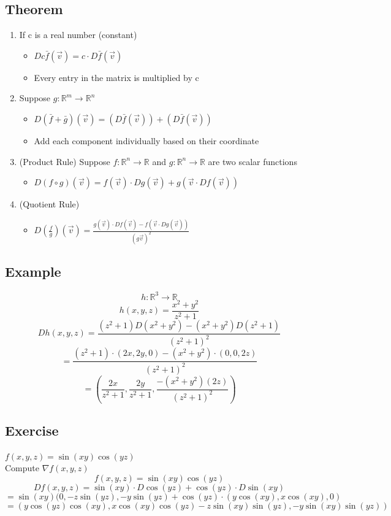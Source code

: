 \documentclass{article}
\begin{document}
\subsection*{Theorem}
\begin{enumerate}
    \item If c is a real number (constant)
    \begin{itemize}
        \item $Dc\bar{f}(\vec{v})=c\cdot D\bar{f}(\vec{v})$
        \item Every entry in the matrix is multiplied by c
    \end{itemize}
    \item Suppose $g:\mathbb{R}^m\rightarrow\mathbb{R}^n$
    \begin{itemize}
        \item $D(\bar{f}+\bar{g})(\vec{v})=(D\bar{f}(\vec{v}))+(D\bar{f}(\vec{v}))$
        \item Add each component individually based on their coordinate
    \end{itemize}
    \item (Product Rule) Suppose $f:\mathbb{R}^n\rightarrow\mathbb{R}$ and $g: \mathbb{R}^n\rightarrow\mathbb{R}$ are two scalar functions
    \begin{itemize}
        \item $D(f\circ g)(\vec{v})=f(\vec{v})\cdot Dg(\vec{v})+g(\vec{v}\cdot Df(\vec{v}))$
    \end{itemize}
    \item (Quotient Rule) 
    \begin{itemize}
        \item $D(\frac{f}{g})(\vec{v})=\frac{g(\vec{v})\cdot Df(\vec{v})-f(\vec{v}\cdot Dg(\vec{v}))}{(g\vec{v})^2}$
    \end{itemize}
\end{enumerate}

\subsection*{Example}
\[h:\mathbb{R}^3\rightarrow\mathbb{R}\]
\[h(x,y,z)=\frac{x^2+y^2}{z^2+1}\]
\[Dh(x,y,z)=\frac{(z^2+1)D(x^2+y^2)-(x^2+y^2)D(z^2+1)}{(z^2+1)^2}\]
\[=\frac{(z^2+1)\cdot (2x,2y,0)-(x^2+y^2)\cdot (0,0,2z)}{(z^2+1)^2}\]
\[=(\frac{2x}{z^2+1},\frac{2y}{z^2+1},\frac{-(x^2+y^2)(2z)}{(z^2+1)^2})\]
\subsection*{Exercise}
$f(x,y,z)=\sin(xy)\cos(yz)$\\
Compute $\nabla f(x,y,z)$
\[f(x,y,z)=\sin(xy)\cos(yz)\]
\[Df(x,y,z)=\sin(xy)\cdot D\cos(yz)+\cos(yz)\cdot D\sin(xy)\]
\[=\sin(xy)(0,-z\sin(yz),-y\sin(yz)+\cos(yz)\cdot(y\cos(xy),x\cos(xy),0)\]
\[=(y\cos(yz)\cos(xy),x\cos(xy)\cos(yz)-z\sin(xy)\sin(yz),-y\sin(xy)\sin(yz))\]
\end{document}
